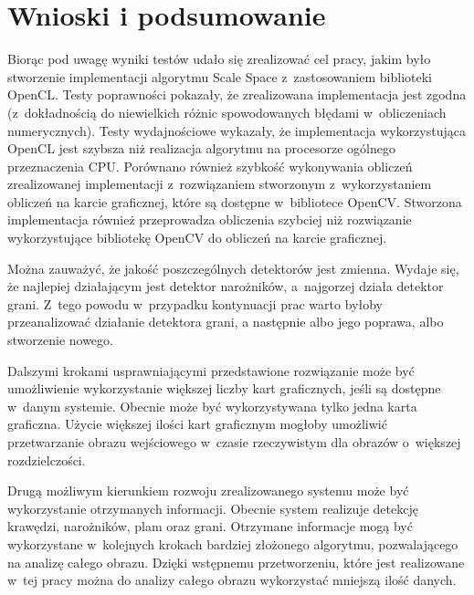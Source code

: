 \chapter{Wnioski i podsumowanie}
\label{cha:podsumowanie}

Biorąc pod uwagę wyniki testów udało się zrealizować cel pracy, jakim było stworzenie implementacji algorytmu Scale Space z~zastosowaniem biblioteki OpenCL. Testy poprawności pokazały, że zrealizowana implementacja jest zgodna (z~dokładnością do niewielkich różnic spowodowanych błędami w~obliczeniach numerycznych). Testy wydajnościowe wykazały, że implementacja wykorzystująca OpenCL jest szybsza niż realizacja algorytmu na procesorze ogólnego przeznaczenia CPU. Porównano również szybkość wykonywania obliczeń zrealizowanej implementacji z~rozwiązaniem stworzonym z~wykorzystaniem obliczeń na karcie graficznej, które są dostępne w~bibliotece OpenCV. Stworzona implementacja również przeprowadza obliczenia szybciej niż rozwiązanie wykorzystujące bibliotekę OpenCV do obliczeń na karcie graficznej.

Można zauważyć, że jakość poszczególnych detektorów jest zmienna. Wydaje się, że najlepiej działającym jest detektor narożników, a~najgorzej działa detektor grani. Z~tego powodu w~przypadku kontynuacji prac warto byłoby przeanalizować działanie detektora grani, a następnie albo jego poprawa, albo stworzenie nowego.

Dalszymi krokami usprawniającymi przedstawione rozwiązanie może być umożliwienie wykorzystanie większej liczby kart graficznych, jeśli są dostępne w~danym systemie. Obecnie może być wykorzystywana tylko jedna karta graficzna. Użycie większej ilości kart graficznym mogłoby umożliwić przetwarzanie obrazu wejściowego w~czasie rzeczywistym dla obrazów o~większej rozdzielczości.

Drugą możliwym kierunkiem rozwoju zrealizowanego systemu może być wykorzystanie otrzymanych informacji. Obecnie system realizuje detekcję krawędzi, narożników, plam oraz grani. Otrzymane informacje mogą być wykorzystane w~kolejnych krokach bardziej złożonego algorytmu, pozwalającego na analizę całego obrazu. Dzięki wstępnemu przetworzeniu, które jest realizowane w~tej pracy można do analizy całego obrazu wykorzystać mniejszą ilość danych.
